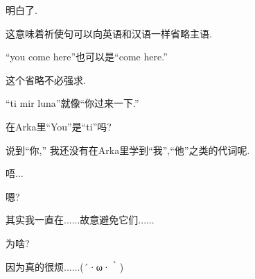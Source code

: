 明白了.

这意味着祈使句可以向英语和汉语一样省略主语.

``you come here''也可以是``come here.''


这个省略不必强求.

``ti mir luna''就像``你过来一下.''


在Arka里``You''是``ti''吗?

说到``你,'' 我还没有在Arka里学到``我'',``他''之类的代词呢.


唔...

嗯?


其实我一直在......故意避免它们......


为啥?


因为真的很烦......(´·ω·｀)







